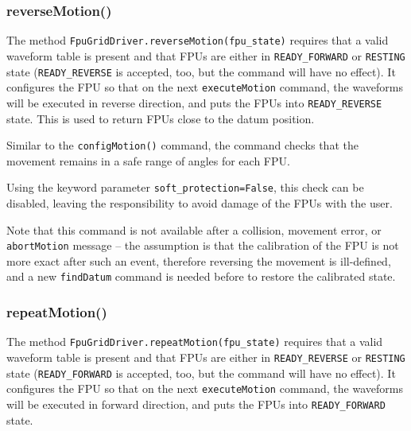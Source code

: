 \documentclass[11pt,a4paper]{scrartcl}
\begin{document}
\subsubsection{reverseMotion()}

\begin{sloppypar}
The method \texttt{FpuGridDriver.reverseMotion(fpu\_state)} requires
that a valid waveform table is present and that FPUs are either in
\texttt{READY\_FORWARD} or \texttt{RESTING} state
(\texttt{READY\_REVERSE} is accepted, too, but the command will have
no effect). It configures the FPU so that on the next
\texttt{executeMotion} command, the waveforms will be executed in
reverse direction, and puts the FPUs into \texttt{READY\_REVERSE}
state. This is used to return FPUs close to the datum position.
\end{sloppypar}

Similar to the \texttt{configMotion()} command, the command checks
that the movement remains in a safe range of angles for each
FPU.

Using the keyword parameter \texttt{soft\_protection=False}, this
check can be disabled, leaving the responsibility to avoid damage of
the FPUs with the user.


Note that this command is not available after a collision, movement
error, or \texttt{abortMotion} message -- the assumption is that the
calibration of the FPU is not more exact after such an event,
therefore reversing the movement is ill-defined, and a new
\texttt{findDatum} command is needed before to restore the calibrated
state.


\subsubsection{repeatMotion()}

\begin{sloppypar}
The method \texttt{FpuGridDriver.repeatMotion(fpu\_state)} requires
that a valid waveform table is present and that FPUs are either in
\texttt{READY\_REVERSE} or \texttt{RESTING} state
(\texttt{READY\_FORWARD} is accepted, too, but the command will have
no effect). It configures the FPU so that on the next
\texttt{executeMotion} command, the waveforms will be executed in
forward direction, and puts the FPUs into \texttt{READY\_FORWARD}
state. 
\end{sloppypar}
\end{document}
